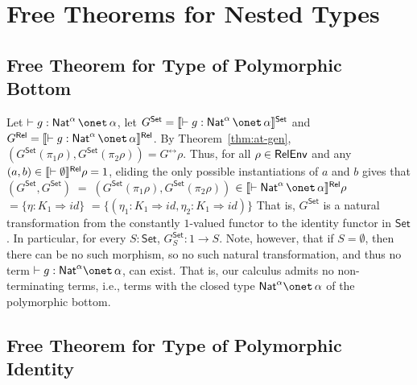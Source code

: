 \documentclass[runningheads]{llncs}
\newcommand{\set}{\mathsf{Set}}
\renewcommand{\id}{\mathit{id}}
\renewcommand{\id}{\mathit{id}}
\begin{document}
\section{Free Theorems for Nested Types}

\subsection{Free Theorem for Type of Polymorphic
  Bottom}\label{sec:bottom} 

Let $ \vdash g : \Nat^\alpha \,\onet\,\alpha$, let $G^\set =
\setsem{\vdash g : \Nat^\alpha \,\onet\,\alpha}$ and $G^\rel =
\relsem{\vdash g : \Nat^\alpha \,\onet\,\alpha}$.  By
Theorem~\ref{thm:at-gen}, $(G^\set(\pi_1\rho),G^\set(\pi_2\rho)) =
G^\rel\rho$. Thus, for all $\rho \in \mathsf{RelEnv}$ and any $(a, b) \in
\llbracket{\vdash \emptyset}\rrbracket^{\mathsf{Rel}}\rho = 1$, eliding the only possible
instantiations of $a$ and $b$ gives that $(G^\set,G^\set) \;= \;
(G^\set(\pi_1 \rho), G^\set (\pi_2 \rho))$ $ \in \relsem{\vdash
  \Nat^\alpha \,\onet\,\alpha}\rho$ $ = \{\eta : K_1 \Rightarrow
\id\}$ $ = \{(\eta_1 : K_1 \Rightarrow \id, \eta_2 : K_1 \Rightarrow
\id)\}$ That is, $G^\set$ is a natural transformation from the
constantly $1$-valued functor to the identity functor in $\set$. In
particular, for every $S : \set$, $G^\set_S : 1 \to S$. Note, however,
that if $S = \emptyset$, then there can be no such morphism, so no
such natural transformation, and thus no term $\vdash g : \Nat^\alpha
\onet \,\alpha$, can exist.  That is, our calculus admits no
non-terminating terms, i.e., terms with the closed type $\Nat^\alpha
\onet \,\alpha$ of the polymorphic bottom.

\subsection{Free Theorem for Type of Polymorphic
  Identity}\label{sec:identity} 
\end{document}
